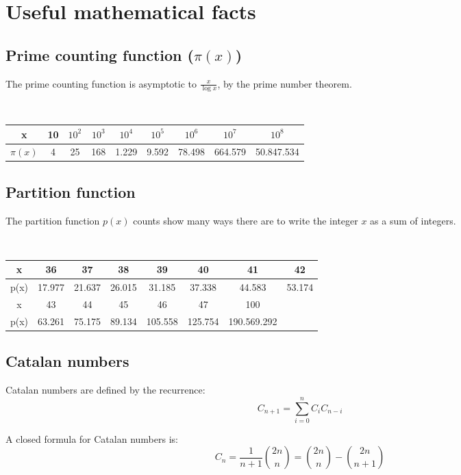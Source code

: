 \documentclass[a4paper]{amsart}
\begin{document}
  \section{Useful mathematical facts}
  \begin{multicols}{2}
    \subsection{Prime counting function ($\pi(x)$)} The prime counting function is asymptotic to $\frac{x}{\log x}$, by the prime number theorem.

      \ 

      \begin{tabular}{|c|c|c|c|c|c|c|c|c|}
        \hline 
          x&10&$10^2$&$10^3$&$10^4$&$10^5$&$10^6$&$10^7$&$10^8$\\ \hline
          $\pi(x)$&4&25&168&1.229&9.592&78.498&664.579&50.847.534\\ \hline
      \end{tabular}

    \subsection{Partition function} The partition function $p(x)$ counts show many ways there are to write the integer $x$ as a sum of integers.

      \

      \begin{tabular}{|c|c|c|c|c|c|c|c|}
        \hline
        x&36&37&38&39&40&41&42 \\ \hline
        p(x)&17.977&21.637&26.015&31.185&37.338&44.583&53.174 \\ \hline\hline
        x&43&44&45&46&47&100& \\ \hline
        p(x)&63.261&75.175&89.134&105.558&125.754&190.569.292& \\ \hline
      \end{tabular}

    \subsection{Catalan numbers} Catalan numbers are defined by the recurrence:
      \begin{equation*}
        C_{n+1} = \sum_{i=0}^nC_iC_{n-i}
      \end{equation*}

      A closed formula for Catalan numbers is:
      \begin{equation*}
        C_n = \frac{1}{n+1}\binom{2n}{n} = \binom{2n}{n} - \binom{2n}{n+1}
      \end{equation*}


\end{multicols}
\end{document}
